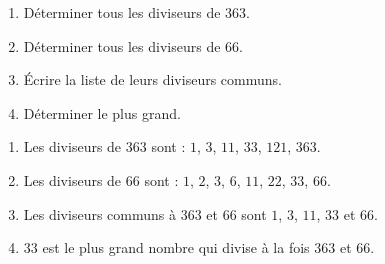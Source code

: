 \begin{exercice*}
    \begin{enumerate}
        \item Déterminer tous les diviseurs de $363$.
        \item Déterminer tous les diviseurs de $66$.
        \item Écrire la liste de leurs diviseurs communs.
        \item Déterminer le plus grand.
    \end{enumerate}
    \begin{changemargin}{0mm}{-10mm}
    \end{changemargin}
\end{exercice*}
\begin{corrige}
    \begin{enumerate}
        \item Les diviseurs de $363$ sont : $1$, $3$, $11$, $33$, $121$, $363$.
        \item Les diviseurs de 66 sont : $1$, $2$, $3$, $6$, $11$, $22$, $33$, $66$.
        \item Les diviseurs communs à $363$ et $66$ sont $1$, $3$, $11$, $33$ et $66$.
        \item $33$ est le plus grand nombre qui divise à la fois $363$ et $66$.
    \end{enumerate}
\end{corrige}

